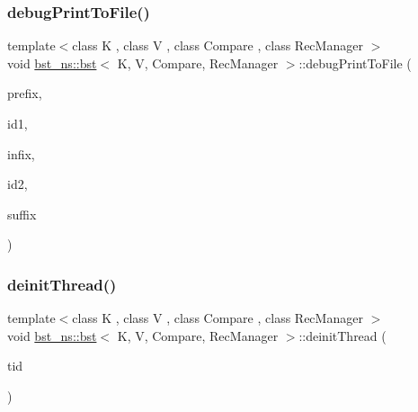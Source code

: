 \subsubsection{\texorpdfstring{debug\+Print\+To\+File()}{debugPrintToFile()}}
{\footnotesize\ttfamily template$<$class K , class V , class Compare , class Rec\+Manager $>$ \\
void \hyperlink{classbst__ns_1_1bst}{bst\+\_\+ns\+::bst}$<$ K, V, Compare, Rec\+Manager $>$\+::debug\+Print\+To\+File (\begin{DoxyParamCaption}\item[{std\+::string}]{prefix,  }\item[{long}]{id1,  }\item[{std\+::string}]{infix,  }\item[{long}]{id2,  }\item[{std\+::string}]{suffix }\end{DoxyParamCaption})\hspace{0.3cm}{\ttfamily [inline]}}

\mbox{\label{classbst__ns_1_1bst_a637afb81516af748a18caaf34e20a3b5}} 
\subsubsection{\texorpdfstring{deinit\+Thread()}{deinitThread()}}
{\footnotesize\ttfamily template$<$class K , class V , class Compare , class Rec\+Manager $>$ \\
void \hyperlink{classbst__ns_1_1bst}{bst\+\_\+ns\+::bst}$<$ K, V, Compare, Rec\+Manager $>$\+::deinit\+Thread (\begin{DoxyParamCaption}\item[{const int}]{tid }\end{DoxyParamCaption})\hspace{0.3cm}{\ttfamily [inline]}}

\mbox{\label{classbst__ns_1_1bst_a9f5db4d1669ab7e4c45c3f0e56a1794e}} 
